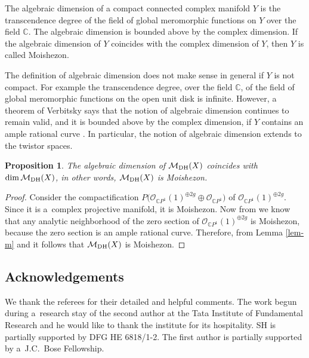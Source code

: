 \documentclass[pdftex]{sigma}
\numberwithin{equation}{section}
\newtheorem{Proposition}[Theorem]{Proposition}
 { \theoremstyle{definition}
\newtheorem{Definition}[Theorem]{Definition}
\newtheorem{Remark}[Theorem]{Remark} }
\begin{document}
The algebraic dimension of a compact connected complex manifold $Y$ is the transcendence degree of the f\/ield of global meromorphic functions on $Y$ over the f\/ield $\mathbb C$. The algebraic dimension is bounded above by the complex dimension. If the algebraic dimension of $Y$ coincides with the complex dimension of $Y$, then $Y$ is called Moishezon.

The def\/inition of algebraic dimension does not make sense in general if $Y$ is not compact. For example the transcendence degree, over the f\/ield $\mathbb C$, of the f\/ield of global meromorphic functions on the open unit disk is inf\/inite. However, a theorem of Verbitsky says that the notion of algebraic dimension continues to remain valid, and it is bounded above by the complex dimension, if $Y$ contains an ample rational curve \cite[p.~329, Theorem~1.4]{Ve}. In particular, the notion of algebraic dimension extends to the twistor spaces.

\begin{Proposition}\label{prop-m}
The algebraic dimension of ${\mathcal M}_{\rm DH}(X)$ coincides with $\dim {\mathcal M}_{\rm DH}(X)$, in other words, ${\mathcal M}_{\rm DH}(X)$ is Moishezon.
\end{Proposition}

\begin{proof} Consider the compactif\/ication $P\big({\mathcal O}_{{\mathbb C}P^1}(1)^{\oplus 2g}\oplus{\mathcal O}_{{\mathbb C}P^1}\big)$ of ${\mathcal O}_{{\mathbb C}P^1}(1)^{\oplus 2g}$. Since it is a~complex projective manifold, it is Moishezon. Now from \cite[p.~337, Theorem~3.4]{Ve} we know that any analytic neighborhood of the zero section of ${\mathcal O}_{{\mathbb C}P^1}(1)^{\oplus 2g}$ is Moishezon, because the zero section is an ample rational curve. Therefore, from Lemma \ref{lem-m} and \cite[p.~337, Theorem~3.4]{Ve} it follows that ${\mathcal M}_{\rm DH}(X)$ is Moishezon.
\end{proof}

\subsection*{Acknowledgements}

We thank the referees for their detailed and helpful comments. The work begun during a~research stay of the second author at the Tata Institute of Fundamental Research and he would like to thank the institute for its hospitality. SH is partially supported by DFG HE 6818/1-2. The f\/irst author is partially supported by a~J.C.~Bose Fellowship.
\end{document}
